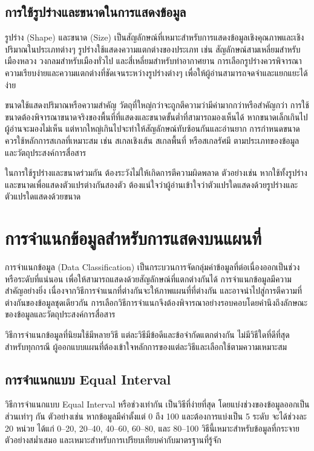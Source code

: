 \subsection{การใช้รูปร่างและขนาดในการแสดงข้อมูล}

รูปร่าง (Shape) และขนาด (Size) เป็นสัญลักษณ์ที่เหมาะสำหรับการแสดงข้อมูลเชิงคุณภาพและเชิงปริมาณในประเภทต่างๆ รูปร่างใช้แสดงความแตกต่างของประเภท เช่น สัญลักษณ์สามเหลี่ยมสำหรับเมืองหลวง วงกลมสำหรับเมืองทั่วไป และสี่เหลี่ยมสำหรับท่าอากาศยาน การเลือกรูปร่างควรพิจารณาความเรียบง่ายและความแตกต่างที่ชัดเจนระหว่างรูปร่างต่างๆ เพื่อให้ผู้อ่านสามารถจดจำและแยกแยะได้ง่าย

ขนาดใช้แสดงปริมาณหรือความสำคัญ วัตถุที่ใหญ่กว่าจะถูกตีความว่ามีค่ามากกว่าหรือสำคัญกว่า การใช้ขนาดต้องพิจารณาขนาดจริงของพื้นที่ที่แสดงและขนาดขั้นต่ำที่สามารถมองเห็นได้ หากขนาดเล็กเกินไปผู้อ่านจะมองไม่เห็น แต่หากใหญ่เกินไปจะทำให้สัญลักษณ์ทับซ้อนกันและอ่านยาก การกำหนดขนาดควรใช้หลักการสเกลที่เหมาะสม เช่น สเกลเชิงเส้น สเกลพื้นที่ หรือสเกลรัศมี ตามประเภทของข้อมูลและวัตถุประสงค์การสื่อสาร

ในการใช้รูปร่างและขนาดร่วมกัน ต้องระวังไม่ให้เกิดการตีความผิดพลาด ตัวอย่างเช่น หากใช้ทั้งรูปร่างและขนาดเพื่อแสดงตัวแปรต่างกันสองตัว ต้องแน่ใจว่าผู้อ่านเข้าใจว่าตัวแปรใดแสดงด้วยรูปร่างและตัวแปรใดแสดงด้วยขนาด

\section{การจำแนกข้อมูลสำหรับการแสดงบนแผนที่}

การจำแนกข้อมูล (Data Classification) เป็นกระบวนการจัดกลุ่มค่าข้อมูลที่ต่อเนื่องออกเป็นช่วงหรือระดับที่แน่นอน เพื่อให้สามารถแสดงด้วยสัญลักษณ์ที่แตกต่างกันได้ การจำแนกข้อมูลมีความสำคัญอย่างยิ่ง เนื่องจากวิธีการจำแนกที่ต่างกันจะให้ภาพแผนที่ที่ต่างกัน และอาจนำไปสู่การตีความที่ต่างกันของข้อมูลชุดเดียวกัน การเลือกวิธีการจำแนกจึงต้องพิจารณาอย่างรอบคอบโดยคำนึงถึงลักษณะของข้อมูลและวัตถุประสงค์การสื่อสาร

วิธีการจำแนกข้อมูลที่นิยมใช้มีหลายวิธี แต่ละวิธีมีข้อดีและข้อจำกัดแตกต่างกัน ไม่มีวิธีใดที่ดีที่สุดสำหรับทุกกรณี ผู้ออกแบบแผนที่ต้องเข้าใจหลักการของแต่ละวิธีและเลือกใช้ตามความเหมาะสม

\subsection{การจำแนกแบบ Equal Interval}

วิธีการจำแนกแบบ Equal Interval หรือช่วงเท่ากัน เป็นวิธีที่ง่ายที่สุด โดยแบ่งช่วงของข้อมูลออกเป็นส่วนเท่าๆ กัน ตัวอย่างเช่น หากข้อมูลมีค่าตั้งแต่ 0 ถึง 100 และต้องการแบ่งเป็น 5 ระดับ จะได้ช่วงละ 20 หน่วย ได้แก่ 0--20, 20--40, 40--60, 60--80, และ 80--100 วิธีนี้เหมาะสำหรับข้อมูลที่กระจายตัวอย่างสม่ำเสมอ และเหมาะสำหรับการเปรียบเทียบค่ากับมาตรฐานที่รู้จัก

